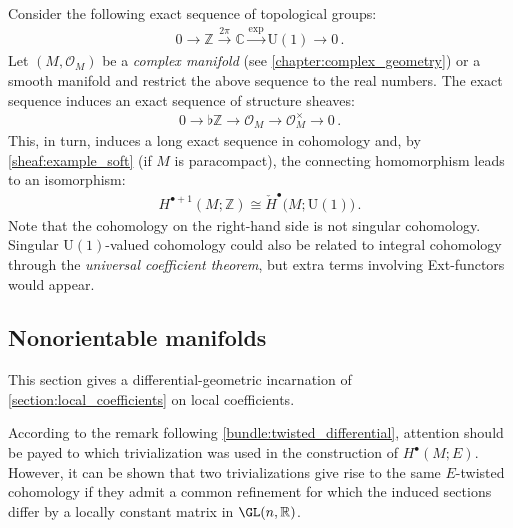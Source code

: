    \begin{property}
        Consider the following exact sequence of topological groups:
        \begin{gather}
            0\longrightarrow\mathbb{Z}\overset{2\pi}{\longrightarrow}\mathbb{C}\overset{\exp}{\longrightarrow}\mathrm{U}(1)\longrightarrow0\,.
        \end{gather}
        Let $(M,\mathcal{O}_M)$ be a \textit{complex manifold} (see \cref{chapter:complex_geometry}) or a smooth manifold and restrict the above sequence to the real numbers. The exact sequence induces an exact sequence of structure sheaves:
        \begin{gather}
            0\longrightarrow\flat\mathbb{Z}\longrightarrow\mathcal{O}_M\longrightarrow\mathcal{O}_M^\times\longrightarrow0\,.
        \end{gather}
        This, in turn, induces a long exact sequence in cohomology and, by \cref{sheaf:example_soft} (if $M$ is paracompact), the connecting homomorphism leads to an isomorphism:
        \begin{gather}
            \label{bundle:U1_cohomology_isomorphism}
            H^{\bullet+1}(M;\mathbb{Z})\cong\check{H}^\bullet\bigl(M;\mathrm{U}(1)\bigr)\,.
        \end{gather}
        Note that the cohomology on the right-hand side is not singular cohomology. Singular $\mathrm{U}(1)$-valued cohomology could also be related to integral cohomology through the \textit{universal coefficient theorem}, but extra terms involving Ext-functors would appear.
    \end{property}

\subsection{Nonorientable manifolds}

    This section gives a differential-geometric incarnation of \cref{section:local_coefficients} on local coefficients.

    \begin{remark}
        According to the remark following \cref{bundle:twisted_differential}, attention should be payed to which trivialization was used in the construction of $H^\bullet(M;E)$. However, it can be shown that two trivializations give rise to the same $E$-twisted cohomology if they admit a common refinement for which the induced sections differ by a locally constant matrix in $\GL(n,\mathbb{R})$.
    \end{remark}

